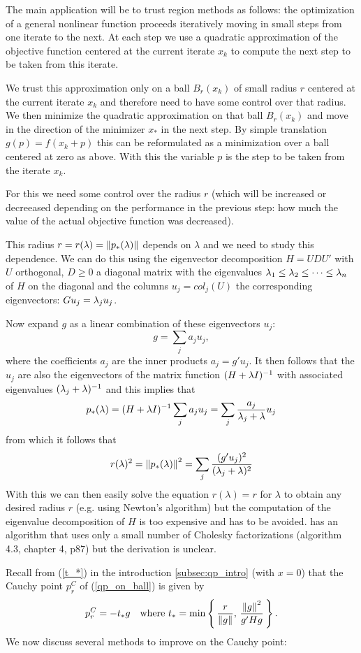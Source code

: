 The main application will be to trust region methods as follows: the 
optimization of a general nonlinear function proceeds iteratively moving in
small steps from one iterate to the next. At each step we use a quadratic 
approximation of the objective function centered at the current iterate $x_k$ to 
compute the next step to be taken from this iterate.

We trust this approximation only on a ball $B_r(x_k)$ of small radius $r$ 
centered at the current iterate $x_k$ and therefore need to have some control 
over that radius. We then minimize the quadratic approximation on that ball 
$B_r(x_k)$ and move in the direction of the minimizer $x_*$ in the next step.
By simple translation $g(p)=f(x_k+p)$ this can be reformulated as a minimization 
over a ball centered at zero as above. With this the variable $p$ is the step to
be taken from the iterate $x_k$.

For this we need some control over the radius $r$ (which will be increased or
decreeased depending on the performance in the previous step: how much the value
of the actual objective function was decreased).

This radius $r=r(\lambda)=\left\|p_*(\lambda)\right\|$ depends on $\lambda$ and we 
need to study this dependence. We can do this using the eigenvector 
decomposition $H=UDU'$ with $U$ orthogonal, $D\geq 0$ a diagonal matrix 
with the eigenvalues $\lambda_1\leq \lambda_2\leq\dots\leq\lambda_n$ of $H$ on the diagonal
and the columns $u_j=col_j(U)$ the corresponding eigenvectors: $Gu_j=\lambda_ju_j$. 

\noindent
Now expand $g$ as a linear combination of these eigenvectors $u_j$:
$$
g=\sum_ja_ju_j,
$$
where the coefficients $a_j$ are the inner products $a_j=g'u_j$. It then follows
that the $u_j$ are also the eigenvectors of the matrix function $(H+\lambda I)^{-1}$
with associated eigenvalues $(\lambda_j+\lambda)^{-1}$ and this implies that
$$
p_*(\lambda)=
(H+\lambda I)^{-1}\sum_ja_ju_j=
\sum_j\frac{a_j}{\lambda_j+\lambda}u_j
$$
from which it follows that
%
\begin{equation}
\label{norm_r}
r(\lambda)^2=
\left\|p_*(\lambda)\right\|^2=\sum_j\frac{(g'u_j)^2}{(\lambda_j+\lambda)^2}
\end{equation}
%
With this we can then easily solve the equation $r(\lambda)=r$ for $\lambda$ to obtain 
any desired radius $r$ (e.g. using Newton's algorithm) but the computation of the eigenvalue 
decomposition of $H$ is too expensive and has to be avoided. \cite{NW} has an algorithm that   
uses only a small number of Cholesky factorizations (algorithm 4.3, chapter 4, p87) but the  
derivation is unclear.

\noindent
Recall from (\ref{t_*}) in the introduction \ref{subsec:qp_intro} (with $x=0$) that the Cauchy 
point $p^C_r$ of (\ref{qp_on_ball}) is given by
%
\begin{equation}
\label{CauchyPoint_1}
p^C_r = -t_*g
\quad\text{where }
t_* = \min\left\{\thinspace
\frac{r}{\left\|g\right\|},\thinspace\frac{\left\|g\right\|^2}{g'Hg}
\thinspace\right\}.
\end{equation}
%  
We now discuss several methods to improve on the Cauchy point:

